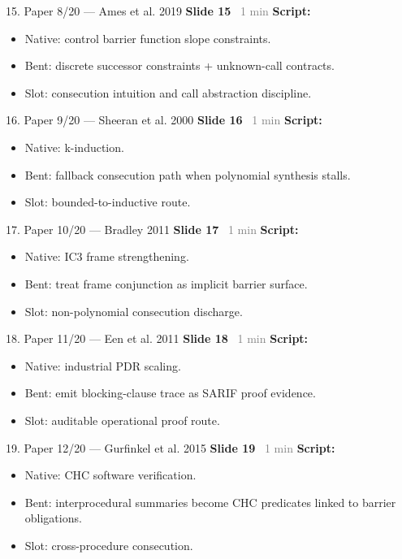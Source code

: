 \documentclass[aspectratio=169]{beamer}
\newcommand{\syncline}[2]{\textbf{#1} \hfill \textcolor{gray}{#2}}
\begin{document}
\begin{frame}[shrink=18]{15. Paper 8/20 — Ames et al. 2019}
\syncline{Slide 15}{~1 min}
\textbf{Script:}
\begin{itemize}
  \item Native: control barrier function slope constraints.
  \item Bent: discrete successor constraints + unknown-call contracts.
  \item Slot: consecution intuition and call abstraction discipline.
\end{itemize}
\end{frame}

\begin{frame}[shrink=18]{16. Paper 9/20 — Sheeran et al. 2000}
\syncline{Slide 16}{~1 min}
\textbf{Script:}
\begin{itemize}
  \item Native: k-induction.
  \item Bent: fallback consecution path when polynomial synthesis stalls.
  \item Slot: bounded-to-inductive route.
\end{itemize}
\end{frame}

\begin{frame}[shrink=18]{17. Paper 10/20 — Bradley 2011}
\syncline{Slide 17}{~1 min}
\textbf{Script:}
\begin{itemize}
  \item Native: IC3 frame strengthening.
  \item Bent: treat frame conjunction as implicit barrier surface.
  \item Slot: non-polynomial consecution discharge.
\end{itemize}
\end{frame}

\begin{frame}[shrink=18]{18. Paper 11/20 — Een et al. 2011}
\syncline{Slide 18}{~1 min}
\textbf{Script:}
\begin{itemize}
  \item Native: industrial PDR scaling.
  \item Bent: emit blocking-clause trace as SARIF proof evidence.
  \item Slot: auditable operational proof route.
\end{itemize}
\end{frame}

\begin{frame}[shrink=18]{19. Paper 12/20 — Gurfinkel et al. 2015}
\syncline{Slide 19}{~1 min}
\textbf{Script:}
\begin{itemize}
  \item Native: CHC software verification.
  \item Bent: interprocedural summaries become CHC predicates linked to barrier obligations.
  \item Slot: cross-procedure consecution.
\end{itemize}
\end{frame}
\end{document}
